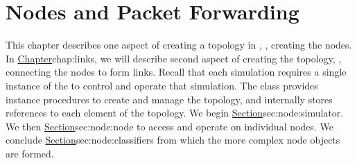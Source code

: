 \chapter{Nodes and Packet Forwarding}
\label{chap:nodes}

This chapter describes one aspect of creating a topology in \ns,
\ie, creating the nodes.
In 
\href{the next chapter}{Chapter}{chap:links},
we will describe second aspect of creating the topology,
\ie, connecting the nodes to form links.
Recall that each simulation requires a single instance of the
 to control and operate that simulation.
The class provides instance procedures to create and manage the topology,
and internally stores references to each element of the topology.
We begin 
\href{by describing the procedures in the class Simulator}{%
        Section}{sec:node:simulator}.
We then
\href{describe the instance procedures in the class Node}{%
        Section}{sec:node:node}
to access and operate on individual nodes.
We conclude
\href{with detailed descriptions of the Classifier}{%
        Section}{sec:node:classifiers}
from which the more complex node objects are formed.

